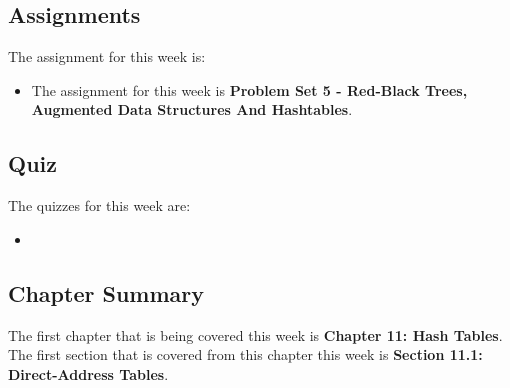 \subsection{Assignments}

The assignment for this week is:

\begin{itemize}
    \item The assignment for this week is \textbf{Problem Set 5 - Red-Black Trees, Augmented Data Structures And Hashtables}. 
\end{itemize}

\subsection{Quiz}

The quizzes for this week are:

\begin{itemize}
    \item {} \textbullet {} 
\end{itemize}

\subsection{Chapter Summary}

The first chapter that is being covered this week is \textbf{Chapter 11: Hash Tables}. The first section that is covered from this chapter this week is \textbf{Section 11.1: Direct-Address Tables}.

